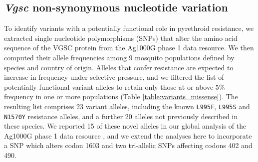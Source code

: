 \documentclass[a4paper,11pt,abstracton,hidelinks]{scrartcl}
\begin{document}
\subsection*{\textit{Vgsc} non-synonymous nucleotide variation}


%
To identify variants with a potentially functional role in pyrethroid resistance, we extracted single nucleotide polymorphisms (SNPs) that alter the amino acid sequence of the VGSC protein from the Ag1000G phase 1 data resource.
%
We then computed their allele frequencies among 9 mosquito populations defined by species and country of origin.
%
Alleles that confer resistance are expected to increase in frequency under selective pressure, and we filtered the list of potentially functional variant alleles to retain only those at or above 5\% frequency in one or more populations (Table \ref{table:variants_missense}).
%
The resulting list comprises 23 variant alleles, including the known \texttt{L995F}, \texttt{L995S} and \texttt{N1570Y} resistance alleles, and a further 20 alleles not previously described in these species.
%
We reported 15 of these novel alleles in our global analysis of the Ag1000G phase 1 data resource \cite{Ag1000gConsortium2017}, and we extend the analyses here to incorporate a SNP which alters codon 1603 and two tri-allelic SNPs affecting codons 402 and 490.
\end{document}
